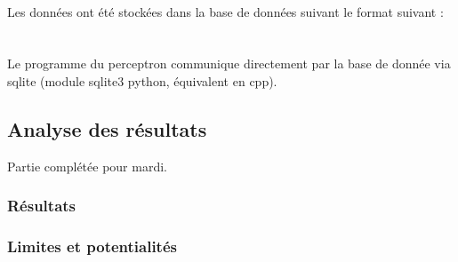 \documentclass[a4paper, 11pt]{article}
\begin{document}
\\Les données ont été stockées dans la base de données suivant le format suivant :
\\
\\
\\

Le programme du perceptron communique directement par la base de donnée via sqlite (module sqlite3 python, équivalent en cpp).

\subsection{Analyse des résultats}
Partie complétée pour mardi.
	\subsubsection{Résultats}
	\subsubsection{Limites et potentialités}
	
 
\end{document}
